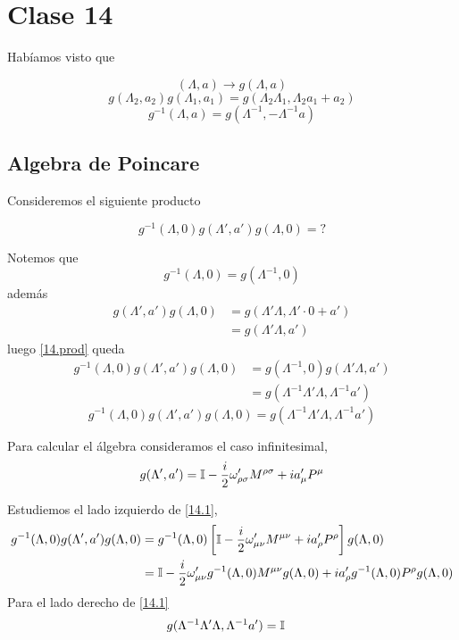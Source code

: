 \section{Clase 14}
Habíamos visto que

\begin{equation}
  (\Lambda,a)\to g(\Lambda,a)
\end{equation}
\begin{equation}
  g(\Lambda_2,a_2)g(\Lambda_1,a_1)=g(\Lambda_2\Lambda_1,\Lambda_2a_1+a_2)
\end{equation}
\begin{equation}
  g^{-1}(\Lambda,a)=g(\Lambda^{-1},-\Lambda^{-1}a)
\end{equation}
\subsection{Algebra de Poincare}
Consideremos el siguiente producto

\begin{equation}\label{14.prod}
  g^{-1}(\Lambda,0)g(\Lambda',a')g(\Lambda,0)=?
\end{equation}

Notemos que
\begin{equation}
  g^{-1}(\Lambda,0)=g(\Lambda^{-1},0)
\end{equation}
además
\begin{align}
  g(\Lambda',a')g(\Lambda,0)&=g(\Lambda'\Lambda,\Lambda'\cdot 0+a')\\
  &=g(\Lambda'\Lambda,a')
\end{align}
luego \eqref{14.prod} queda
\begin{align}
  g^{-1}(\Lambda,0)g(\Lambda',a')g(\Lambda,0)&=g(\Lambda^{-1},0)g(\Lambda'\Lambda,a')\\
  &=g(\Lambda^{-1}\Lambda'\Lambda,\Lambda^{-1}a')
\end{align}
\begin{equation}\label{14.1}
  \boxed{ g^{-1}(\Lambda,0)g(\Lambda',a')g(\Lambda,0)=g(\Lambda^{-1}\Lambda'\Lambda,\Lambda^{-1}a')}
\end{equation}

Para calcular el álgebra consideramos el caso infinitesimal,
\begin{equation}
  g(\Lambda',a')=\mathbb{I} -\frac{i}{2}\omega'_{\rho \sigma }M^{\rho\sigma }+ia'_\mu P^\mu 
\end{equation}

Estudiemos el lado izquierdo de \eqref{14.1},
\begin{align}
  g^{-1}(\Lambda,0)g(\Lambda',a')g(\Lambda,0)&=g^{-1}(\Lambda,0)\left[\mathbb{I} -\frac{i}{2}\omega'_{\mu  \nu  }M^{\mu \nu  }+ia'_\rho P^\rho \right]g(\Lambda,0)\\
  &=\mathbb{I}-\frac{i}{2}\omega'_{\mu\nu }g^{-1}(\Lambda,0)M^{\mu\nu }g(\Lambda,0)+ia'_\rho g^{-1}(\Lambda,0)P^\rho g(\Lambda,0)\label{14.2}
\end{align}
Para el lado derecho de \eqref{14.1}
\begin{align}
  g(\Lambda^{-1}\Lambda'\Lambda,\Lambda^{-1}a')&=\mathbb{I} 
\end{align}

